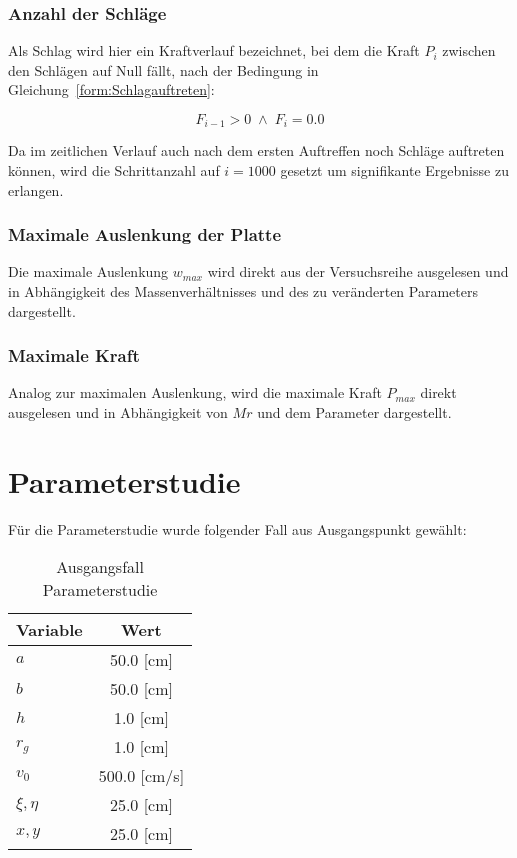 \subsubsection{Anzahl der Schläge}

Als Schlag wird hier ein Kraftverlauf bezeichnet, bei dem die Kraft $P_{i}$ zwischen den Schlägen auf Null fällt, nach der Bedingung in Gleichung~\ref{form:Schlagauftreten}:

\begin{equation} 
	\label{form:Schlagauftreten}
	F_{i-1} > 0 \; \wedge \; F_{i} = 0.0 
\end{equation}

Da im zeitlichen Verlauf auch nach dem ersten Auftreffen noch Schläge auftreten können, wird die Schrittanzahl auf $i = 1000$ gesetzt um signifikante Ergebnisse zu erlangen. 

\subsubsection{Maximale Auslenkung der Platte}

Die maximale Auslenkung $w_{max}$ wird direkt aus der Versuchsreihe ausgelesen und in Abhängigkeit des Massenverhältnisses und des zu veränderten Parameters dargestellt.

\subsubsection{Maximale Kraft}

Analog zur maximalen Auslenkung, wird die maximale Kraft $P_{max}$ direkt ausgelesen und in Abhängigkeit von $Mr$ und dem Parameter dargestellt.



\section{Parameterstudie}

Für die Parameterstudie wurde folgender Fall aus Ausgangspunkt gewählt: 

\begin{table}[H]
	\begin{center}
		\caption{Ausgangsfall Parameterstudie}
		\label{tab:Ausgang}
		\begin{tabular}{l|c}
			\textbf{Variable} & \textbf{Wert}\\
			\hline
			$a$ & 50.0 [cm]\\
			$b$ & 50.0 [cm]\\
			$h$ & 1.0 [cm]\\
			$r_{g}$ & 1.0 [cm]\\
			$v_{0}$ & 500.0 [cm/s]\\
			$\xi,\eta$ & 25.0 [cm]\\
			$x,y$ & 25.0 [cm]\\ 		
		\end{tabular}
	\end{center}
\end{table}

